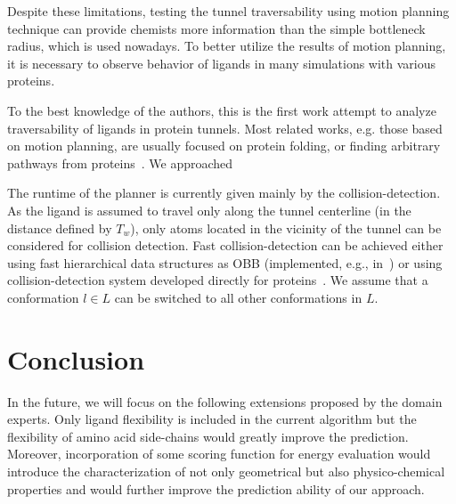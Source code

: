 \documentclass{svmult}
\def\rv{T_w}
\def\L{L}
\begin{document}
Despite these limitations, testing the tunnel traversability using motion planning technique can provide chemists more information
than the simple bottleneck radius, which is used nowadays.
To better utilize the results of motion planning, it is necessary to observe behavior of ligands in many simulations with various
proteins.

To the best knowledge of the authors, this is the first work attempt to analyze traversability of ligands in protein tunnels.
Most related works, e.g. those based on motion planning, are usually focused on protein folding, or finding arbitrary pathways
from proteins~\cite{cortes2010simulating,guieysse2008structure}.
We approached 

The runtime of the planner is currently given mainly by the collision-detection.
As the ligand is assumed to travel only along the tunnel centerline (in the distance defined by $\rv$),
only atoms located in the vicinity of the tunnel can be considered for collision detection.
Fast collision-detection can be achieved either using fast hierarchical data structures as OBB (implemented, e.g., in~\cite{ozcollide})
    or using collision-detection system developed directly for proteins~\cite{ruiz2005biocd}.
We assume that a conformation $l \in \L$ can be switched to all other conformations in $\L$.


\section{Conclusion }
In the future, we will focus on the following extensions proposed by the domain experts.
Only ligand flexibility is included in the current algorithm but the flexibility of amino acid side-chains would greatly improve the prediction. 
Moreover, incorporation of some scoring function for energy evaluation would introduce the characterization of not only geometrical but also physico-chemical properties and would further improve the prediction ability of our approach.




\end{document}
